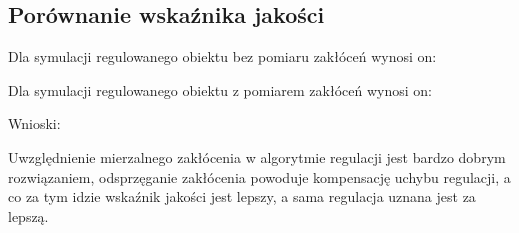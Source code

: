 \subsection{Porównanie wskaźnika jakości}
\label{projekt:zad5:porownanie}

Dla symulacji regulowanego obiektu bez pomiaru zakłóceń wynosi on:

Dla symulacji regulowanego obiektu z pomiarem zakłóceń wynosi on:

Wnioski: 

Uwzględnienie mierzalnego zakłócenia w algorytmie regulacji jest bardzo dobrym rozwiązaniem, 
odsprzęganie zakłócenia powoduje kompensację uchybu regulacji, 
a co za tym idzie wskaźnik jakości jest lepszy, 
a sama regulacja uznana jest za lepszą.

